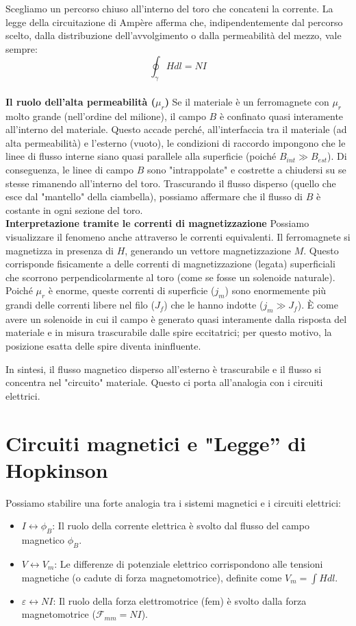 \documentclass{book}
\begin{document}
Scegliamo un percorso chiuso all'interno del toro che concateni la corrente. La legge della circuitazione di Ampère afferma che, indipendentemente dal percorso scelto, dalla distribuzione dell'avvolgimento o dalla permeabilità del mezzo, vale sempre:
$$
\oint_{\gamma} H dl = NI
$$
\\
\textbf{Il ruolo dell'alta permeabilità ($\mu_r$)}
Se il materiale è un ferromagnete con $\mu_r$ molto grande (nell'ordine del milione), il campo $B$ è confinato quasi interamente all'interno del materiale. Questo accade perché, all'interfaccia tra il materiale (ad alta permeabilità) e l'esterno (vuoto), le condizioni di raccordo impongono che le linee di flusso interne siano quasi parallele alla superficie (poiché $B_{int} \gg B_{est}$).
Di conseguenza, le linee di campo $B$ sono "intrappolate" e costrette a chiudersi su se stesse rimanendo all'interno del toro. Trascurando il flusso disperso (quello che esce dal "mantello" della ciambella), possiamo affermare che il flusso di $B$ è costante in ogni sezione del toro.
\\
\textbf{Interpretazione tramite le correnti di magnetizzazione}
Possiamo visualizzare il fenomeno anche attraverso le correnti equivalenti. Il ferromagnete si magnetizza in presenza di $H$, generando un vettore magnetizzazione $M$. Questo corrisponde fisicamente a delle correnti di magnetizzazione (legata) superficiali che scorrono perpendicolarmente al toro (come se fosse un solenoide naturale).
Poiché $\mu_r$ è enorme, queste correnti di superficie ($j_m$) sono enormemente più grandi delle correnti libere nel filo ($J_f$) che le hanno indotte ($j_m \gg J_f$). È come avere un solenoide in cui il campo è generato quasi interamente dalla risposta del materiale e in misura trascurabile dalle spire eccitatrici; per questo motivo, la posizione esatta delle spire diventa ininfluente.

In sintesi, il flusso magnetico disperso all'esterno è trascurabile e il flusso si concentra nel "circuito" materiale. Questo ci porta all'analogia con i circuiti elettrici.

\section{Circuiti magnetici e "Legge” di Hopkinson}

Possiamo stabilire una forte analogia tra i sistemi magnetici e i circuiti elettrici:

\begin{itemize}
  \item $I \leftrightarrow \phi_B$: Il ruolo della corrente elettrica è svolto dal flusso del campo magnetico $\phi_B$.
  \item $V \leftrightarrow V_m$: Le differenze di potenziale elettrico corrispondono alle tensioni magnetiche (o cadute di forza magnetomotrice), definite come $V_m= \int H dl$.
  \item $\varepsilon \leftrightarrow NI$: Il ruolo della forza elettromotrice (fem) è svolto dalla forza magnetomotrice ($\mathcal{F}_{mm} = NI$).
\end{itemize}
\end{document}
